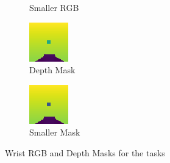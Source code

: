 \begin{figure}[htpb]
\begin{subfigure}{0.2\linewidth}
    \caption{Smaller RGB}\label{subfig:small-rgb}
  \end{subfigure}
  \begin{subfigure}{0.20\linewidth}
    \centering
    \includegraphics[width=\linewidth]{assets/depth-interfacing/normal-depth.png}
    \caption{Depth Mask}\label{subfig:normal-depth}
  \end{subfigure}
  \begin{subfigure}{0.20\linewidth}
    \centering
    \includegraphics[width=\linewidth]{assets/depth-interfacing/smaller-depth.png}
    \caption{Smaller Mask }\label{subfig:small-depth}
  \end{subfigure}
  \caption{Wrist RGB and Depth Masks for the tasks}\label{fig:di-rgb-vs-depth}
\end{figure}

